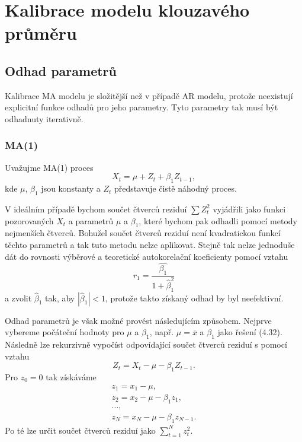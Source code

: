 \section{Kalibrace modelu klouzavého průměru}

\subsection{Odhad parametrů}

Kalibrace MA modelu je složitější než v případě AR modelu, protože neexistují explicitní funkce odhadů pro jeho parametry. Tyto parametry tak musí být odhadnuty iterativně.

\subsubsection{MA(1)}

Uvažujme MA(1) proces
\begin{equation}
X_t = \mu + Z_t + \beta_1 Z_{t-1},
\end{equation}
kde $\mu$, $\beta_1$ jsou konstanty a $Z_t$ představuje čistě náhodný proces.

V ideálním případě bychom součet čtverců reziduí $\sum Z_t^2$ vyjádřili jako funkci pozorovaných $X_t$ a parametrů $\mu$ a $\beta_1$, které bychom pak odhadli pomocí metody nejmenších čtverců. Bohužel součet čtverců reziduí není kvadratickou funkcí těchto parametrů a tak tuto metodu nelze aplikovat. Stejně tak nelze jednoduše dát do rovnosti výběrové a teoretické autokorelační koeficienty pomocí vztahu
\begin{equation}
r_1 = \frac{\hat{\beta_1}}{1 + \hat{\beta}_1^2}
\end{equation}
a zvolit $\hat{\beta}_1$ tak, aby $|\hat{\beta}_1| < 1$, protože takto získaný odhad by byl neefektivní.

Odhad parametrů je však možné provést následujícím způsobem. Nejprve vybereme počáteční hodnoty pro $\mu$ a $\beta_1$, např. $\mu = \overline{x}$ a $\beta_1$ jako řešení (4.32). Následně lze rekurzivně vypočíst odpovídající součet čtverců reziduí s pomocí vztahu
\begin{equation}
Z_t = X_t - \mu - \beta_1 Z_{t-1}.
\end{equation}
Pro $z_0 = 0$ tak získáváme
\begin{equation}
\begin{aligned}
z_1 = x_1 - \mu,\\
z_2 = x_2 - \mu - \beta_1 z_1,\\
...,\\
z_N = x_N - \mu - \beta_1 z_{N-1}.
\end{aligned}
\end{equation}
Po té lze určit součet čtverců reziduí jako $\sum_{t=1}^N z_t^2$.

